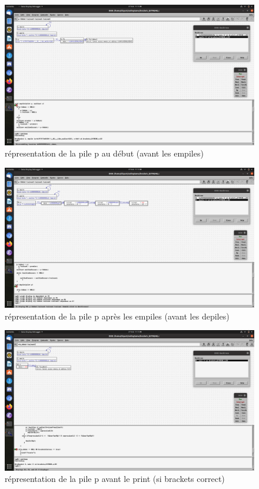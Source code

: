 \documentclass[11pt]{article}
\begin{document}
\begin{figure}[htbp]
\centering
\includegraphics[width=.9\linewidth]{./img/bracketsDebut.png}
\caption{\label{fig:org610fb8e}
répresentation de la pile p au début (avant les empiles)}
\end{figure}




\begin{figure}[htbp]
\centering
\includegraphics[width=.9\linewidth]{./img/bracketsFinEmpile.png}
\caption{\label{fig:org8647058}
répresentation de la pile p après les empiles (avant les depiles)}
\end{figure}




\begin{figure}[htbp]
\centering
\includegraphics[width=.9\linewidth]{./img/bracketsFinTrue.png}
\caption{\label{fig:org1b1cc5e}
répresentation de la pile p avant le print (si brackets correct)}
\end{figure}
\end{document}
